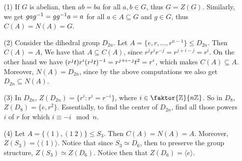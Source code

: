 \begin{example}\label{example_2.4}
  \begin{enumerate}
    \item[(1)] If $G$ is abelian, then  $ab=ba$ for all  $a,b \in G$, thus
      $G=Z(G)$. Similarly, we get $gag^{-1}=gg^{-1}a=a$ for all $a \in A
      \subseteq G$ and  $g \in G$, thus $C(A)=N(A)=G$.

    \item[(2)] Consider the dihedral group $D_{2n}$. Let $A=\{e,r, \dots,
      r^{n-1}\} \leq D_{2n}$. Then $C(A)=A$, We have that $A \subseteq
      C(A)$, since $r^jr^ir^{-j}=r^{j+i-j}=r^i$. On the other hand we have
      $(r^jt)r^i(r^jt)^{-1}=r^{j+i-j}t^2=r^i$, which makes $C(A)
      \subseteq A$. Moreover, $N(A)=D_{2n}$, since by the above
      computations we also get $D_{2n} \subseteq N(A)$.

    \item[(3)] In $D_{2n}$, $Z(D_{2n})=\{r^i : r^i=r^{-i}\}$, where $i \in
      \faktor{\Z}{n\Z}$. So in $D_8$, $Z(D_8)=\{e, r^2\}$. Essentially, to
      find the center of $D_{2n}$, find all those powers $i$ of $r$ for
      which  $i \equiv -i \mod{n}$.

    \item[(4)] Let $A=\{(1), (1 \ 2)\} \leq S_3$. Then $C(A)=N(A)=A$.
      Moreover, $Z(S_3)=\langle (1) \rangle$. Notice that since $S_3 \simeq D_6$, then
      to preserve the group structure,  $Z(S_3) \simeq Z(D_6)$. Notice
      then that $Z(D_6)=\langle e \rangle$.
  \end{enumerate}
\end{example}



